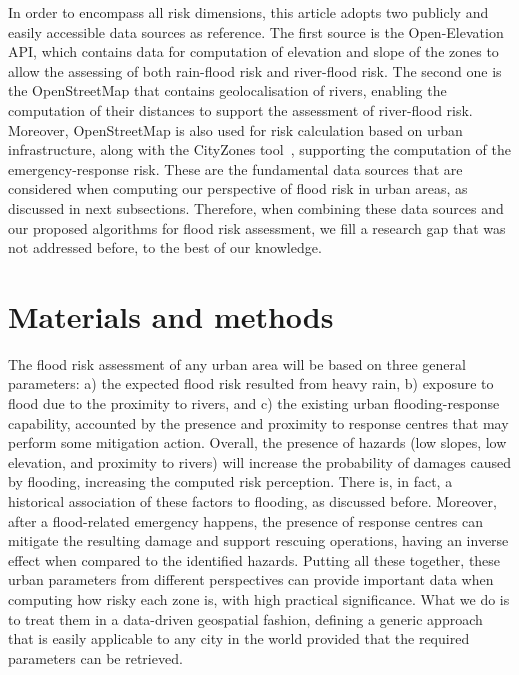 \begin{refsection}
In order to encompass all risk dimensions, this article adopts two publicly and easily accessible data sources as reference. The first source is the Open-Elevation API, which contains data for computation of elevation and slope of the zones to allow the assessing of both rain-flood risk and river-flood risk. The second one is the OpenStreetMap that contains geolocalisation of rivers, enabling the computation of their distances to support the assessment of river-flood risk. Moreover, OpenStreetMap is also used for risk calculation based on urban infrastructure, along with the CityZones tool~\cite{cityzones}, supporting the computation of the emergency-response risk. These are the fundamental data sources that are considered when computing our perspective of flood risk in urban areas, as discussed in next subsections. Therefore, when combining these data sources and our proposed algorithms for flood risk assessment, we fill a research gap that was not addressed before, to the best of our knowledge. 


\section{Materials and methods}
\label{sec:fundamentals}

The flood risk assessment of any urban area will be based on three general parameters: a) the expected flood risk resulted from heavy rain, b) exposure to flood due to the proximity to rivers, and c) the existing urban flooding-response capability, accounted by the presence and proximity to response centres that may perform some mitigation action. Overall, the presence of hazards (low slopes, low elevation, and proximity to rivers) will increase the probability of damages caused by flooding, increasing the computed risk perception. There is, in fact, a historical association of these factors to flooding, as discussed before. Moreover, after a flood-related emergency happens, the presence of response centres can mitigate the resulting damage and support rescuing operations, having an inverse effect when compared to the identified hazards. Putting all these together, these urban parameters from different perspectives can provide important data when computing how risky each zone is, with high practical significance. What we do is to treat them in a data-driven geospatial fashion, defining a generic approach that is easily applicable to any city in the world provided that the required parameters can be retrieved. 


\end{refsection}
